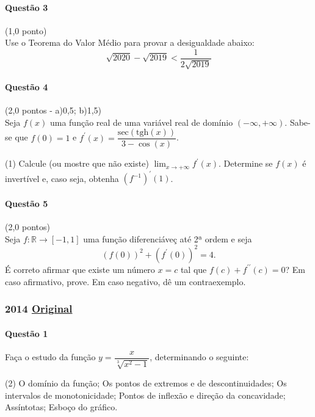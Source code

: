 \documentclass[12pt,a4paper]{article}
\newcommand{\R}{\mathbb{R}}
\newcommand{\original}[1]{\tiny \href{#1}{Original} \normalsize}
\begin{document}
\paragraph{Questão 3} (1,0 ponto)\\
Use o Teorema do Valor Médio para provar a desigualdade abaixo: $$\sqrt{2020} - \sqrt{2019} < \dfrac{1}{2\sqrt{2019}}$$

\paragraph{Questão 4} (2,0 pontos - a)0,5; b)1,5)\\
Seja $f(x)$ uma função real de uma variável real de domínio $(-\infty, +\infty)$. Sabe-se que $f(0) = 1$ e $f^{\prime}(x) =\dfrac{\mathrm{sec}(\mathrm{tgh}(x))}{3-\cos(x)}$.

\begin{tasks}(1)
\task Calcule (ou mostre que não existe) $\lim_{x\to +\infty} f^{\prime}(x)$.
\task Determine se $f(x)$ é invertível e, caso seja, obtenha $(f^{-1})^{\prime}(1)$.
\end{tasks}

\paragraph{Questão 5} (2,0 pontos)\\
Seja $f: \R \to [-1,1]$ uma função diferenciáveç até 2ª ordem e seja $$\left(f(0)\right)^2 + \left(f^{\prime}(0)\right)^2 = 4.$$
É correto afirmar que existe um número $x=c$ tal que $f(c) + f^{\prime\prime}(c) = 0$?
Em caso afirmativo, prove. Em caso negativo, dê um contraexemplo.


\newpage

\subsubsection{2014 \original{https://drive.google.com/open?id=1dIUE3zysDeVc0egdvl3kDJ79QsjEO6VM}}

\paragraph{Questão 1}
Faça o estudo da função $y=\dfrac{x}{\sqrt[3]{x^2-1}}$, determinando o seguinte:
\begin{tasks}(2)
\task O domínio da função;
\task Os pontos de extremos e de descontinuidades;
\task Os intervalos de monotonicidade;
\task Pontos de inflexão e direção da concavidade;
\task Assíntotas;
\task Esboço do gráfico.
\end{tasks}
\end{document}
